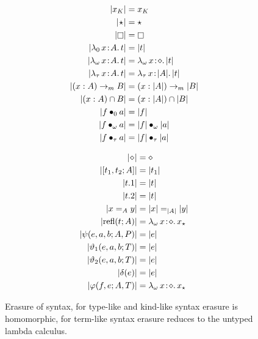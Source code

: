 

\begin{figure}
    \centering
    \begin{minipage}{0.5\textwidth}
        \begin{align*}
            |x_K| &= x_K \\
            |\!\star\!| &= \star \\
            |\kind| &= \kind \\
            |\abs{\lambda_0}{x}{A}{t}| &= |t| \\
            |\abs{\lambda_\omega}{x}{A}{t}| &= \abs{\lambda_\omega}{x}{\diamond}{|t|} \\
            |\abs{\lambda_\tau}{x}{A}{t}| &= \abs{\lambda_\tau}{x}{|A|}{|t|} \\
            |(x:A) \to_m B| &= (x:|A|) \to_m |B| \\
            |(x:A) \cap B| &= (x:|A|) \cap |B| \\
            |\app{f}{0}{a}| &= |f| \\
            |\app{f}{\omega}{a}| &= \app{|f|}{\omega}{|a|} \\
            |\app{f}{\tau}{a}| &= \app{|f|}{\tau}{|a|}
        \end{align*}
    \end{minipage}%
    \begin{minipage}{0.5\textwidth}
        \begin{align*}
            |\!\diamond\!| &= \diamond \\
            |[t_1, t_2; A]| &= |t_1| \\
            |t.1| &= |t| \\
            |t.2| &= |t| \\
            |x =_A y| &= |x| =_{|A|} |y| \\
            |\text{refl}(t; A)| &= {\lambda_\omega}\, x\! : \! \diamond.\, x_\star \\
            |\psi(e, a, b; A, P)| &= |e| \\
            |\vartheta_1(e, a, b; T)| &= |e| \\
            |\vartheta_2(e, a, b; T)| &= |e| \\
            |\delta(e)| &= |e| \\
            |\varphi(f, e; A, T)| &= {\lambda_\omega}\, x\! : \! \diamond.\, x_\star
        \end{align*}
    \end{minipage}
    \caption{Erasure of syntax, for type-like and kind-like syntax erasure is homomorphic, for term-like syntax erasure reduces to the untyped lambda calculus.}
    \label{fig:2:erasure}
\end{figure}
